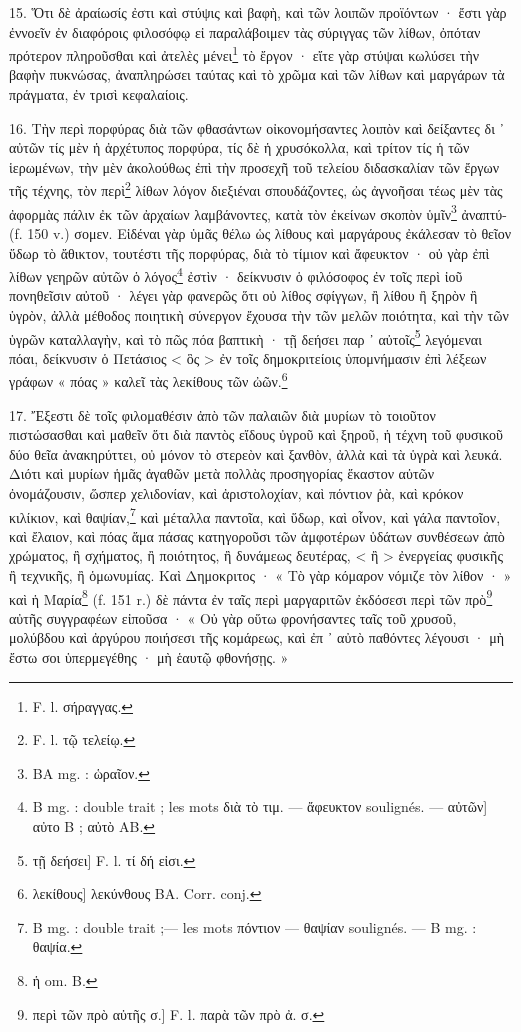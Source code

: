 \documentclass[a4paper, 11pt, oneside, polutonikogreek, french]{article}
\begin{document}
15. Ὅτι δὲ ἀραίωσίς ἐστι καὶ στύψις καὶ βαφὴ, καὶ τῶν λοιπῶν προϊόντων · ἔστι γὰρ ἐννοεῖν ἐν διαφόροις φιλοσόφῳ εἰ παραλάβοιμεν τὰς σύριγγας τῶν λίθων, ὀπόταν πρότερον πληροῦσθαι καὶ ἀτελὲς μένει\footnote{F. l. σήραγγας.} τὸ ἔργον · εἴτε γὰρ στύψαι κωλύσει τὴν βαφὴν πυκνώσας, ἀναπληρώσει ταύτας καὶ τὸ χρῶμα καὶ τῶν λίθων καὶ μαργάρων τὰ πράγματα, ἐν τρισὶ κεφαλαίοις.

16. Τὴν περὶ πορφύρας διὰ τῶν φθασάντων οἰκονομήσαντες λοιπὸν καὶ δείξαντες δι ᾽ αὐτῶν τίς μὲν ἡ ἀρχέτυπος πορφύρα, τίς δὲ ἡ χρυσόκολλα, καὶ τρίτον τίς ἡ τῶν ἱερωμένων, τὴν μὲν ἀκολούθως ἐπὶ τὴν προσεχῆ τοῦ τελείου διδασκαλίαν τῶν ἔργων τῆς τέχνης, τὸν περὶ\footnote{F. l. τῷ τελείῳ.} λίθων λόγον διεξιέναι σπουδάζοντες, ὠς ἀγνοῆσαι τέως μὲν τὰς ἀφορμὰς πάλιν ἐκ τῶν ἀρχαίων λαμβάνοντες, κατὰ τὸν ἐκείνων σκοπὸν ὑμῖν\footnote{BA mg. : ὡραῖον.} ἀναπτύ- (f. 150 v.) σομεν. Εἰδέναι γὰρ ὑμᾶς θέλω ὡς λίθους καὶ μαργάρους ἐκάλεσαν τὸ θεῖον ὕδωρ τὸ ἄθικτον, τουτέστι τῆς πορφύρας, διὰ τὸ τίμιον καὶ ἄφευκτον · οὐ γὰρ ἐπὶ λίθων γεηρῶν αὐτῶν ὁ λόγος\footnote{B mg. : double trait ; les mots διὰ τὸ τιμ. --- ἄφευκτον soulignés. --- αὐτῶν] αὐτο B ; αὐτὸ AB.} ἐστὶν · δείκνυσιν ὁ φιλόσοφος ἐν τοῖς περὶ ἰοῦ πονηθεῖσιν αὐτοῦ · λέγει γὰρ φανερῶς ὅτι οὐ λίθος σφίγγων, ἢ λίθου ἢ ξηρὸν ἢ ὑγρὸν, ἀλλὰ μέθοδος ποιητικὴ σύνεργον ἔχουσα τὴν τῶν μελῶν ποιότητα, καὶ τὴν τῶν ὑγρῶν καταλλαγὴν, καὶ τὸ πῶς πόα βαπτικὴ · τῇ δεήσει παρ ᾽ αὐτοῖς\footnote{τῇ δεήσει] F. l. τί δή εἰσι.} λεγόμεναι πόαι, δείκνυσιν ὁ Πετάσιος < ὃς > ἐν τοῖς δημοκριτείοις ὑπομνήμασιν ἐπὶ λέξεων γράφων « πόας » καλεῖ τὰς λεκίθους τῶν ὠῶν.\footnote{λεκίθους] λεκύνθους BA. Corr. conj.}

17. Ἔξεστι δὲ τοῖς φιλομαθέσιν ἀπὸ τῶν παλαιῶν διὰ μυρίων τὸ τοιοῦτον πιστώσασθαι καὶ μαθεῖν ὅτι διὰ παντὸς εἴδους ὐγροῦ καὶ ξηροῦ, ἡ τέχνη τοῦ φυσικοῦ δύο θεῖα ἀνακηρύττει, οὐ μόνον τὸ στερεὸν καὶ ξανθὸν, ἀλλὰ καὶ τὰ ὑγρὰ καὶ λευκά. Διότι καὶ μυρίων ἡμᾶς ἀγαθῶν μετὰ πολλὰς προσηγορίας ἕκαστον αὐτῶν ὀνομάζουσιν, ὥσπερ χελιδονίαν, καὶ ἀριστολοχίαν, καὶ πόντιον ῥὰ, καὶ κρόκον κιλίκιον, καὶ θαψίαν,\footnote{B mg. : double trait ;--- les mots πόντιον --- θαψίαν soulignés. --- B mg. : θαψία.} καὶ μέταλλα παντοῖα, καὶ ὕδωρ, καὶ οἶνον, καὶ γάλα παντοῖον, καὶ ἔλαιον, καὶ πόας ἅμα πάσας κατηγοροῦσι τῶν ἀμφοτέρων ὑδάτων συνθέσεων ἀπὸ χρώματος, ἢ σχήματος, ἢ ποιότητος, ἢ δυνάμεως δευτέρας, < ἢ > ἐνεργείας φυσικῆς ἢ τεχνικῆς, ἢ ὁμωνυμίας. Καὶ Δημοκριτος · « Τὸ γὰρ κόμαρον νόμιζε τὸν λίθον · » καὶ ἡ Μαρία\footnote{ἡ om. B.} (f. 151 r.) δὲ πάντα ἐν ταῖς περὶ μαργαριτῶν ἐκδόσεσι περὶ τῶν πρὸ\footnote{περὶ τῶν πρὸ αὐτῆς σ.] F. l. παρὰ τῶν πρὸ ἀ. σ.} αὐτῆς συγγραφέων εἰποῦσα · « Οὐ γὰρ οὕτω φρονήσαντες ταῖς τοῦ χρυσοῦ, μολύβδου καὶ ἀργύρου ποιήσεσι τῆς κομάρεως, καὶ ἐπ ᾽ αὐτὸ παθόντες λέγουσι · μὴ ἔστω σοι ὑπερμεγέθης · μὴ ἑαυτῷ φθονήσῃς. »
\end{document}
